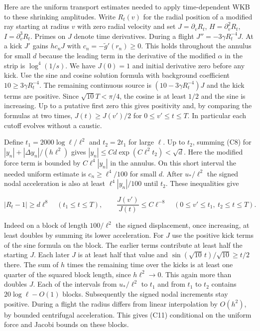 \documentclass[11pt,a4paper]{article}
\begin{document}
Here are the uniform transport estimates needed to apply time-dependent
WKB to these shrinking amplitudes. Write \(R_t(v)\) for the radial
position of a modified ray starting at radius \(v\) with zero radial
velocity and set \(J=\partial_v R_t\), \(H=\partial_v^2R_t\),
\(I=\partial_v^3R_t\). Primes on \(J\) denote time derivatives. During a
flight \(J''=-3\gamma R_t^{-4}J\). At a kick \(J'\) gains \(h c_nJ\)
with \(c_n=-\widetilde g'(r_n)\ge0\). This holds throughout the annulus
for small \(d\) because the leading term in the derivative of the
modified \(\alpha\) in the strip is \(\log^4(1/s)\). We have \(J(0)=1\)
and initial derivative zero before any kick. Use the sine and cosine
solution formula with background coefficient \(10\ge3\gamma R_t^{-4}\).
The remaining continuous source is \((10-3\gamma R_t^{-4})J\) and the
kick terms are positive. Since \(\sqrt{10}T<\pi/4\), the cosine is at
least \(1/2\) and the sine is increasing. Up to a putative first zero
this gives positivity and, by comparing the formulas at two times,
\(J(t)\ge J(v')/2\) for \(0\le v'\le t\le T\). In particular each cutoff
evolves without a caustic.

Define \(t_1=2000\log\ell/\ell^2\) and \(t_2=2t_1\) for large \(\ell\).
Up to \(t_2\), summing (C8) for \(|y_n|+|\Delta y_n|/(h\ell^2)\) gives
\(|y_n|\le C d\exp(C\ell^2 t_2)<\sqrt d\). Here the modified force term
is bounded by \(C\ell^4 |y_n|\) in the annulus. On this short interval
the needed uniform estimate is \(c_n\ge\ell^4/100\) for small \(d\).
After \(u_*/\ell^2\) the signed nodal acceleration is also at least
\(\ell^4|y_n|/100\) until \(t_2\). These inequalities give

\[
 |R_t-1|\ge d\ell^8\quad(t_1\le t\le T),\qquad
 \frac{J(v')}{J(t)}\le C\ell^{-8}
       \quad(0\le v'\le t_1,\ t_2\le t\le T).                 \tag{C11}
\]

Indeed on a block of length \(100/\ell^2\) the signed displacement, once
increasing, at least doubles by summing its lower acceleration. For
\(J\) use the positive kick terms of the sine formula on the block. The
earlier terms contribute at least half the starting \(J\). Each later
\(J\) is at least half that value and
\(\sin(\sqrt{10}\,t)/\sqrt{10}\ge t/2\) there. The sum of \(h\) times
the remaining time over the kicks is at least one quarter of the squared
block length, since \(h\ell^2\to0\). This again more than doubles \(J\).
Each of the intervals from \(u_*/\ell^2\) to \(t_1\) and from \(t_1\) to
\(t_2\) contains \(20\log\ell-O(1)\) blocks. Subsequently the signed
nodal increments stay positive. During a flight the radius differs from
linear interpolation by \(O(h^2)\), by bounded centrifugal acceleration.
This gives (C11) conditional on the uniform force and Jacobi bounds on
these blocks.
\end{document}
